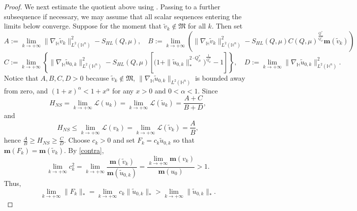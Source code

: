 \documentclass[11pt]{article}
\begin{document}
\begin{proof}
{We next estimate the quotient above using \cite[Lemmas 2.3-2.4]{K25}.} {Passing to a further subsequence if necessary, we may assume that all scalar sequences entering the limits below converge.} Suppose for the moment that $\tilde{v}_k\notin \mathfrak{M}$ for all $k$. Then set
 \begin{equation*}
 A:=\lim\limits_{k\rightarrow+\infty}\|\nabla_\mathbb{H} \tilde{v}_k\|_{L^2(\mathbb{H}^n)}^2-S_{HL}(Q,\mu),\quad B:=\lim\limits_{k\rightarrow+\infty}\left(\|\nabla_\mathbb{H} \tilde{v}_k\|_{L^2(\mathbb{H}^n)}^2-S_{HL}(Q,\mu)C(Q,\mu)^{\frac{Q^{\ast}}{Q^{\ast}_{\mu}}}\mathbf{m}(\tilde{v}_k)\right)
 \end{equation*}
 \begin{equation*}
 C:=\lim\limits_{k\rightarrow+\infty}\left\{\|\nabla_\mathbb{H} \tilde{u}_{0,k}\|_{L^2(\mathbb{H}^n)}^2-S_{HL}(Q,\mu) \left[\Big(1+\|\tilde{u}_{0,k}\|_*^{2\cdot Q^{\ast}_{\mu}}\Big)^{\frac{1}{Q^{\ast}_{\mu}}}-1\right]\right\},\quad D:=\lim\limits_{k\rightarrow+\infty}\|\nabla_\mathbb{H} \tilde{u}_{0,k}\|_{L^2(\mathbb{H}^n)}^2.
 \end{equation*}
 Notice that $A,B,C,D>0$ because $\tilde{v}_k\notin \mathfrak{M}$, $\|\nabla_\mathbb{H} \tilde{u}_{0,k}\|_{L^2(\mathbb{H}^n)}$ is bounded away from zero, and $(1+x)^\alpha<1+x^\alpha$ for any $x>0$ and $0<\alpha<1$. Since
 \begin{equation*}
 H_{NS}=\lim\limits_{k\rightarrow+\infty} \mathcal{L}(u_k)=\lim\limits_{k\rightarrow+\infty} \mathcal{L} (\tilde{u}_k)=\frac{A+C}{B+D},
 \end{equation*}
 and
 \begin{equation*}
 H_{NS}\leq \lim\limits_{k\rightarrow+\infty} \mathcal{L}(v_k)=\lim\limits_{k\rightarrow+\infty} \mathcal{L} (\tilde{v}_k)=\frac{A}{B},
 \end{equation*}
 {hence $\frac{A}{B}\geq H_{NS}\geq\frac{C}{D}$.} {Choose $c_k>0$ and set $F_k=c_k\tilde{u}_{0,k}$ so that $\mathbf{m}(F_k)=\mathbf{m}(\tilde{v}_k)$. By \eqref{contra},}
 \begin{equation*}
 \lim\limits_{k\rightarrow+\infty}c_k^2=\lim\limits_{k\rightarrow+\infty}\frac{\mathbf{m}(\tilde{v}_k)}{\mathbf{m}(\tilde{u}_{0,k})}=
 \frac{\lim\limits_{k\rightarrow+\infty}\mathbf{m}(v_k)}{\mathbf{m}(u_0)}>1.
 \end{equation*}
 Thus,
 \begin{equation*}
 {\lim\limits_{k\rightarrow+\infty}\|F_k\|_*=\lim\limits_{k\rightarrow+\infty}c_k\|\tilde{u}_{0,k}\|_*>\lim\limits_{k\rightarrow+\infty}\|\tilde{u}_{0,k}\|_*.}
 \end{equation*}

\end{proof}
\end{document}
